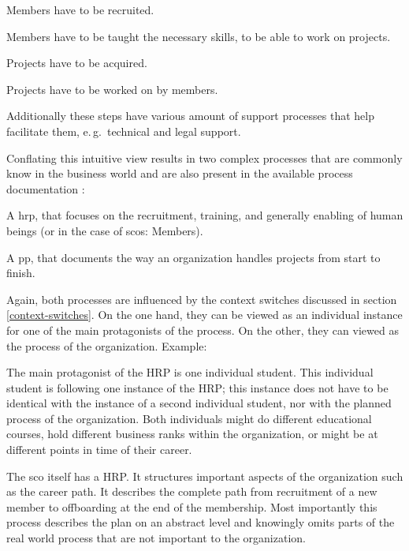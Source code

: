 \documentclass[a4paper, DIV=13, BCOR=0cm]{scrbook}
\newcommand{\eg}{e.\,g.\ }
\begin{document}
\begin{compactitem}
	\item Members have to be recruited.
	\item Members have to be taught the necessary skills, to be able to work on projects.
	\item Projects have to be acquired.
	\item Projects have to be worked on by members.
\end{compactitem}

Additionally these steps have various amount of support processes that help facilitate them, \eg technical and legal support.

Conflating this intuitive view results in two complex processes that are commonly know in the business world \cite{CN} and are also present in the available process documentation \cite{hc-prozesshandbuch}:
\begin{compactenum}
	\item A \gls{hrp}, that focuses on the recruitment, training, and generally enabling of human beings (or in the case of \glspl{sco}: Members).
	\item A \gls{pp}, that documents the way an organization handles projects from start to finish.
\end{compactenum}

Again, both processes are influenced by the context switches discussed in section \ref{context-switches}. On the one hand, they can be viewed as an individual instance for one of the main protagonists of the process. On the other, they can viewed as the process of the organization. Example:
\begin{compactitem}
	\item The main protagonist of the HRP is one individual student. This individual student is following one instance of the HRP; this instance does not have to be identical with the instance of a second individual student, nor with the planned process of the organization. Both individuals might do different educational courses, hold different business ranks within the organization, or might be at different points in time of their career.
	\item The \gls{sco} itself has a HRP. It structures important aspects of the organization such as the career path. It describes the complete path from recruitment of a new member to offboarding at the end of the membership. Most importantly this process describes the plan on an abstract level and knowingly omits parts of the real world process that are not important to the organization.
\end{compactitem}
\end{document}
